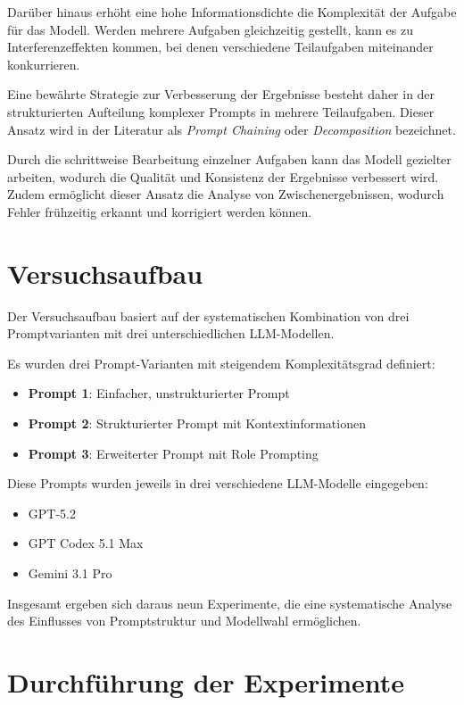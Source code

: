 Darüber hinaus erhöht eine hohe Informationsdichte die
Komplexität der Aufgabe für das Modell. Werden mehrere
Aufgaben gleichzeitig gestellt, kann es zu
Interferenzeffekten kommen, bei denen verschiedene
Teilaufgaben miteinander konkurrieren.

Eine bewährte Strategie zur Verbesserung der Ergebnisse
besteht daher in der strukturierten Aufteilung komplexer
Prompts in mehrere Teilaufgaben. Dieser Ansatz wird in der
Literatur als \textit{Prompt Chaining} oder
\textit{Decomposition} bezeichnet.

Durch die schrittweise Bearbeitung einzelner Aufgaben
kann das Modell gezielter arbeiten, wodurch die Qualität
und Konsistenz der Ergebnisse verbessert wird. Zudem
ermöglicht dieser Ansatz die Analyse von
Zwischenergebnissen, wodurch Fehler frühzeitig erkannt
und korrigiert werden können.


\section{Versuchsaufbau}

Der Versuchsaufbau basiert auf der systematischen
Kombination von drei Promptvarianten mit
drei unterschiedlichen LLM-Modellen.

Es wurden drei Prompt-Varianten mit steigendem
Komplexitätsgrad definiert:

\begin{itemize}
    \item \textbf{Prompt 1}: Einfacher, unstrukturierter Prompt
    \item \textbf{Prompt 2}: Strukturierter Prompt mit Kontextinformationen
    \item \textbf{Prompt 3}: Erweiterter Prompt mit Role Prompting
\end{itemize}

Diese Prompts wurden jeweils in drei verschiedene
LLM-Modelle eingegeben:

\begin{itemize}
    \item GPT-5.2
    \item GPT Codex 5.1 Max
    \item Gemini 3.1 Pro
\end{itemize}

Insgesamt ergeben sich daraus neun Experimente, die eine
systematische Analyse des Einflusses von Promptstruktur
und Modellwahl ermöglichen.

\section{Durchführung der Experimente}

